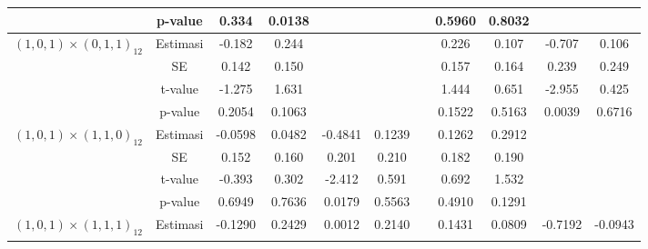 \begin{enumerate}[label=\alph*.]
\begin{longtable}{|c|c|c|c|c|c|c|c|c|c|c|}
            & p-value
            & {0.334} & {0.0138}
            & {} & {} & {}
            & {0.5960} & {0.8032}
            & {} & {} \\ \hline

            \multirow{4}{*}{$(1,0,1)\times(0,1,1)_{12}$}
            & Estimasi
            & {-0.182} & {0.244}
            & {} & {} & {}
            & {0.226} & {0.107}
            & {-0.707} & {0.106} \\ \cline{2-11}

            & SE
            & {0.142} & {0.150}
            & {} & {} & {}
            & {0.157} & {0.164}
            & {0.239} & {0.249} \\ \cline{2-11}

            & t-value
            & {-1.275} & {1.631}
            & {} & {} & {}
            & {1.444} & {0.651}
            & {-2.955} & {0.425} \\ \cline{2-11}

            & p-value
            & {0.2054} & {0.1063}
            & {} & {} & {}
            & {0.1522} & {0.5163}
            & {0.0039} & {0.6716} \\ \hline

            \multirow{4}{*}{$(1,0,1)\times(1,1,0)_{12}$}
            & Estimasi
            & {-0.0598} & {0.0482}
            & {-0.4841} & {0.1239} & {}
            & {0.1262} & {0.2912}
            & {} & {} \\ \cline{2-11}

            & SE
            & {0.152} & {0.160}
            & {0.201} & {0.210} & {}
            & {0.182} & {0.190}
            & {} & {} \\ \cline{2-11}

            & t-value
            & {-0.393} & {0.302}
            & {-2.412} & {0.591} & {}
            & {0.692} & {1.532}
            & {} & {} \\ \cline{2-11}

            & p-value
            & {0.6949} & {0.7636}
            & {0.0179} & {0.5563} & {}
            & {0.4910} & {0.1291}
            & {} & {} \\ \hline

            \multirow{4}{*}{$(1,0,1)\times(1,1,1)_{12}$}
            & Estimasi
            & {-0.1290} & {0.2429}
            & {0.0012} & {0.2140} & {}
            & {0.1431} & {0.0809}
            & {-0.7192} & {-0.0943} \\ \cline{2-11}


\end{longtable}
\end{enumerate}
